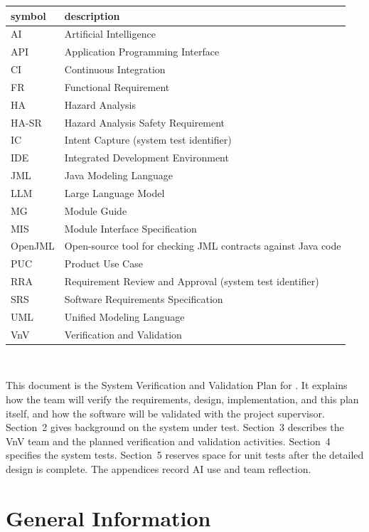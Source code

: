 \documentclass[12pt, titlepage]{article}
\begin{document}
\renewcommand{\arraystretch}{1.2}
\begin{tabular}{l l}
  \toprule
  \textbf{symbol} & \textbf{description}\\
  \midrule
  AI & Artificial Intelligence\\
  API & Application Programming Interface\\
  CI & Continuous Integration\\
  FR & Functional Requirement\\
  HA & Hazard Analysis\\
  HA-SR & Hazard Analysis Safety Requirement\\
  IC & Intent Capture (system test identifier)\\
  IDE & Integrated Development Environment\\
  JML & Java Modeling Language\\
  LLM & Large Language Model\\
  MG & Module Guide\\
  MIS & Module Interface Specification\\
  OpenJML & Open-source tool for checking JML contracts against Java code\\
  PUC & Product Use Case\\
  RRA & Requirement Review and Approval (system test identifier)\\
  SRS & Software Requirements Specification\\
  UML & Unified Modeling Language\\
  VnV & Verification and Validation\\
  \bottomrule
\end{tabular}\\

\newpage


This document is the System Verification and Validation Plan for
\progname{}. It explains how the team will verify the requirements, design,
implementation, and this plan itself, and how the software will be validated
with the project supervisor. Section~2 gives background on the system under
test. Section~3 describes the VnV team and the planned verification and
validation activities. Section~4 specifies the system tests. Section~5
reserves space for unit tests after the detailed design is complete. The
appendices record AI use and team reflection.

\section{General Information}
\end{document}
